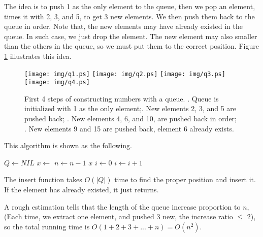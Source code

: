 \documentclass[UTF8]{article}
\begin{document}
The idea is to push 1 as the only element to the queue, then we pop
an element, times it with 2, 3, and 5, to get 3 new elements. We
then push them back to the queue in order. Note that, the new elements may
have already existed in the queue. In such case, we just drop the
element. The new element may also smaller than the others in the queue,
so we must put them to the correct position. Figure \ref{fig:queues}
illustrates this idea.

\begin{figure}[htbp]
       \begin{center}
       	  \texttt{[image: img/q1.ps]}
       	  \texttt{[image: img/q2.ps]}
       	  \texttt{[image: img/q3.ps]}
       	  \texttt{[image: img/q4.ps]}
        \caption{First 4 steps of constructing numbers with a queue. . Queue is initialized with 1 as the only element;. New elements 2, 3, and 5 are pushed back; . New elements 4, 6, and 10, are pushed back in order; . New elements 9 and 15 are pushed back, element 6 already exists.} \label{fig:queues}
       \end{center}
\end{figure}

This algorithm is shown as the following.

\begin{algorithmic}[1]
  \State $Q \gets NIL$
  \State {}
    \State $x \gets$ 
    \State {}
    \State {}
    \State {}
    \State $n \gets n-1$
  \EndWhile
  \State \Return $x$
\EndFunction
\Statex
{}
  \State $i \gets 0$
    \State $i \gets i + 1$
  \EndWhile
    \State \Return
  \EndIf
  \State {}
\EndFunction
\end{algorithmic}

The insert function takes $O(|Q|)$ time to find the proper position and insert
it. If the element has already existed, it just returns.

A rough estimation tells that the length of the queue increase proportion to $n$,
(Each time, we extract one element, and pushed 3 new, the increase ratio $\leq$ 2),
so the total running time is $O(1+2+3+...+n) = O(n^2)$.
\end{document}
